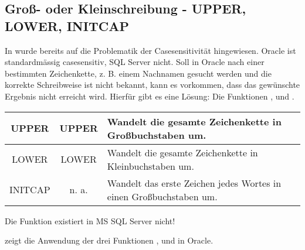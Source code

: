       \subsection{Gro\ss - oder Kleinschreibung - UPPER, LOWER, INITCAP}
        In  wurde bereits auf die Problematik der Casesensitivit\"at hingewiesen. Oracle ist standardm\"assig casesensitiv, SQL Server nicht. Soll in Oracle nach einer bestimmten Zeichenkette, z. B. einem Nachnamen gesucht werden und die korrekte Schreibweise ist nicht bekannt, kann es vorkommen, dass das gew\"unschte Ergebnis nicht erreicht wird. Hierf\"ur gibt es eine L\"osung: Die Funktionen ,  und .
        \begin{center}
          \label{srfstringfct1}
          \begin{small}
            \tabletail{
              \hline
            }
            \tablelasttail {
              \hline
            }
            \begin{supertabular}{|c|c|p{11cm}|}
              UPPER & UPPER& Wandelt die gesamte Zeichenkette in Gro\ss{}buchstaben um.\\
              \hline
              LOWER & LOWER & Wandelt die gesamte Zeichenkette in Kleinbuchstaben um.\\
              \hline
              INITCAP & n. a.& Wandelt das erste Zeichen jedes Wortes in einen Gro\ss{}buchstaben um.\\
            \end{supertabular}
          \end{small}
        \end{center}
        \begin{merke}
          Die Funktion  existiert in MS SQL Server nicht!
        \end{merke}
\clearpage
         zeigt die Anwendung der drei Funktionen ,  und  in Oracle.
